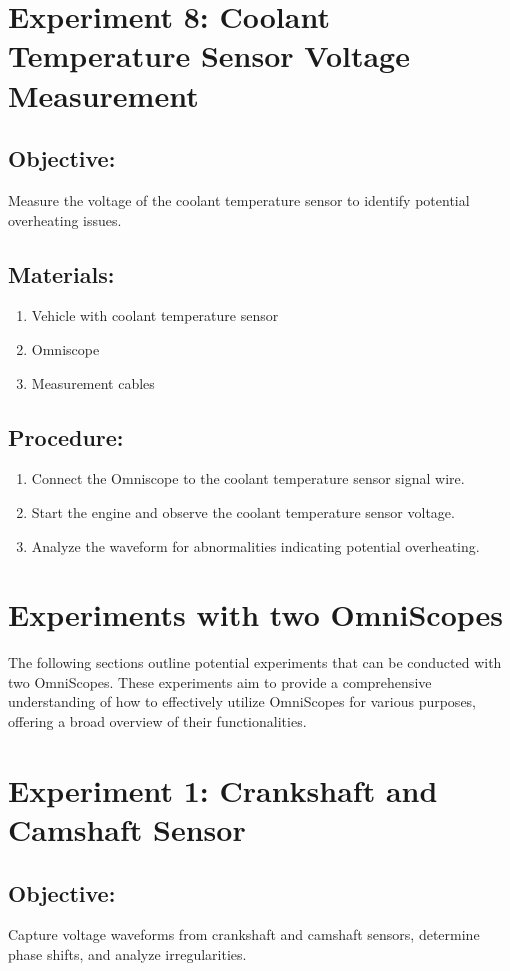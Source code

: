 \documentclass{scrreprt}
\begin{document}
\section*{Experiment 8: Coolant Temperature Sensor Voltage Measurement}
\subsection*{Objective:} Measure the voltage of the coolant temperature sensor to identify potential overheating issues.
\subsection*{Materials:}
\begin{enumerate}
    \item Vehicle with coolant temperature sensor
    \item Omniscope
    \item Measurement cables
\end{enumerate}
\subsection*{Procedure:}
\begin{enumerate}
    \item Connect the Omniscope to the coolant temperature sensor signal wire.
    \item Start the engine and observe the coolant temperature sensor voltage.
    \item Analyze the waveform for abnormalities indicating potential overheating.
\end{enumerate}



\section{Experiments with two OmniScopes}
The following sections outline potential experiments that can be conducted with two OmniScopes. 
These experiments aim to provide a comprehensive understanding of how to effectively utilize OmniScopes for various purposes, offering a broad overview of their functionalities.
\section*{Experiment 1: Crankshaft and Camshaft Sensor}
\subsection*{Objective:} Capture voltage waveforms from crankshaft and camshaft sensors, determine phase shifts, and analyze irregularities.
\end{document}
